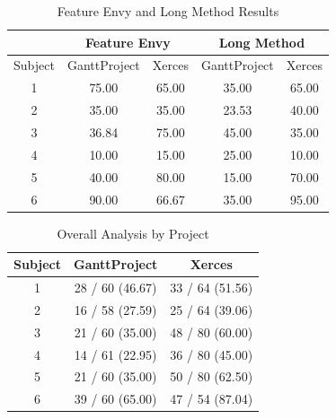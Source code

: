 \documentclass[conference]{IEEEtran}
\begin{document}
\begin{table}[h]
\centering
\caption{Feature Envy and Long Method Results}
\label{tab:results2}
\begin{tabular}{c|cc|cc}
\multicolumn{1}{l}{}    & \multicolumn{2}{|c|}{Feature Envy} & \multicolumn{2}{c}{Long Method} \\ \hline
\multicolumn{1}{c|}{Subject} & GanttProject           & Xerces          & GanttProject      & Xerces     \\ \hline
\multicolumn{1}{c|}{1}  & 75.00                 & 65.00           & 35.00             & 65.00      \\
\multicolumn{1}{c|}{2}  & 35.00                 & 35.00           & 23.53             & 40.00      \\
\multicolumn{1}{c|}{3}  & 36.84                 & 75.00           & 45.00             & 35.00      \\
\multicolumn{1}{c|}{4}  & 10.00                 & 15.00           & 25.00             & 10.00      \\
\multicolumn{1}{c|}{5}  & 40.00                 & 80.00           & 15.00             & 70.00      \\
\multicolumn{1}{c|}{6}  & 90.00                 & 66.67           & 35.00             & 95.00      \\ \hline
\end{tabular}
\end{table}

\begin{table}[h]
\centering
\caption{Overall Analysis by Project}
\label{tab:overall}
\begin{tabular}{ccc}
\hline
Subject & GanttProject    & Xerces          \\ \hline
1       & 28 / 60 (46.67) & 33 / 64 (51.56) \\
2       & 16 / 58 (27.59) & 25 / 64 (39.06) \\
3       & 21 / 60 (35.00) & 48 / 80 (60.00) \\
4       & 14 / 61 (22.95) & 36 / 80 (45.00) \\
5       & 21 / 60 (35.00) & 50 / 80 (62.50) \\
6       & 39 / 60 (65.00) & 47 / 54 (87.04) \\ \hline
\end{tabular}
\end{table}

\end{document}
